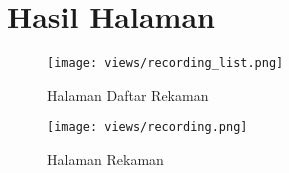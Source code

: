 \chapter{Hasil Halaman}
\label{lamp:B}

%
%
%

\begin{figure}[H]
    \centering
    \texttt{[image: views/recording\_list.png]}
    \caption{Halaman Daftar Rekaman}
    \label{fig:hasil:recording_list}
\end{figure}

\begin{figure}[H]
    \centering
    \texttt{[image: views/recording.png]}
    \caption{Halaman Rekaman}
    \label{fig:hasil:recording}
\end{figure}

%  

